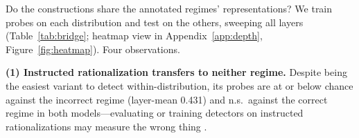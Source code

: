 \documentclass[11pt]{article}
\begin{document}
\begin{table}[t]
\centering
\small
\setlength{\tabcolsep}{4pt}
\caption{Cross-construction transfer, swept over all layers (best and selection-free layer-mean; permutation $p$ on the mean unless marked; permutations coupled across layers). We detect significant transfer only from hint-induced traces (model- and source-dependent), onto the \emph{incorrect} regime. $^{\dagger}$$p$ for the best layer; the mean is n.s.\ ($p{=}.37$).}
\label{tab:bridge}
\end{table}

Do the constructions share the annotated regimes' representations? We train probes on each distribution and test on the others, sweeping all layers (Table~\ref{tab:bridge}; heatmap view in Appendix~\ref{app:depth}, Figure~\ref{fig:heatmap}). Four observations.

\textbf{(1) Instructed rationalization transfers to neither regime.} Despite being the easiest variant to detect within-distribution, its probes are at or below chance against the incorrect regime (layer-mean 0.431) and n.s.\ against the correct regime in both models---evaluating or training detectors on instructed rationalizations may measure the wrong thing \citep[cf.][]{offpolicy2025probes}.
\end{document}
